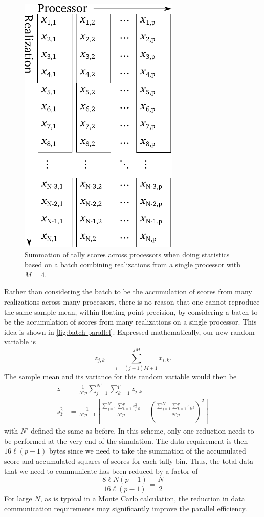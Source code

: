 \begin{figure}[htb]
  \centering
  \includegraphics[width=3in]{figures/ch4/batch-parallel.pdf}
  \caption{Summation of tally scores across processors when doing statistics
    based on a batch combining realizations from a single processor with $M=4$.}
  \label{fig:batch-parallel}
\end{figure}
Rather than considering the batch to be the accumulation of scores from many
realizations across many processors, there is no reason that one cannot
reproduce the same sample mean, within floating point precision, by considering
a batch to be the accumulation of scores from many realizations on a single
processor. This idea is shown in \autoref{fig:batch-parallel}. Expressed
mathematically, our new random variable is
\begin{equation}
  z_{j,k} = \sum_{i=(j-1)M + 1}^{jM} x_{i,k}.
\end{equation}
The sample mean and its variance for this random variable would then be
\begin{align}
  \bar{z} &= \frac{1}{N'p} \sum_{j=1}^{N'} \sum_{k=1}^p z_{j,k} \\ s^2_{\bar{z}}
  &= \frac{1}{N'p-1} \left [ \frac{\sum_{j=1}^{N'} \sum_{k=1}^p z_{j,k}^2}{N'p}
    - \left ( \frac{\sum_{j=1}^{N'} \sum_{k=1}^p z_{j,k}}{N'p} \right )^2 \right
  ]
\end{align}
with $N'$ defined the same as before. In this scheme, only one reduction needs
to be performed at the very end of the simulation. The data requirement is then
$16\ell(p-1)$ bytes since we need to take the summation of the accumulated score
and accumulated squares of scores for each tally bin. Thus, the total data that
we need to communicate has been reduced by a factor of
\begin{equation}
  \frac{8\ell N(p-1)}{16\ell (p-1)} = \frac{N}{2}
\end{equation}
For large $N$, as is typical in a Monte Carlo calculation, the reduction in data
communication requirements may significantly improve the parallel efficiency.
  
